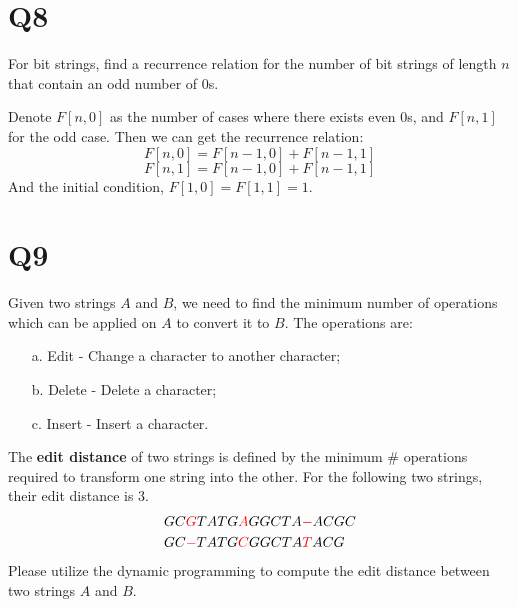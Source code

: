 \documentclass[a4paper,11pt]{article}
\begin{document}
\section*{Q8}
For bit strings, find a recurrence relation for the number of bit
strings of length $n$ that contain an odd number of 0s.
\begin{solution}
    Denote $F[n,0]$ as the number of cases where there exists even 0s, and
    $F[n,1]$ for the odd case. Then we can get the recurrence relation:
    \begin{equation*}
        F[n,0]=F[n-1,0]+F[n-1,1]
    \end{equation*}
    \begin{equation*}
        F[n,1]=F[n-1,0]+F[n-1,1]
    \end{equation*}
    And the initial condition, $F[1,0]=F[1,1]=1$.
\end{solution}

\section*{Q9}
Given two strings $A$ and $B$, we need to find the minimum number of operations which can be applied on $A$ to convert it to $B$. The operations are:
\begin{itemize}
    \item[a.] Edit - Change a character to another character;

    \item[b.] Delete - Delete a character;

    \item[c.] Insert - Insert a character.
\end{itemize}
The \textbf{edit distance} of two strings is defined by the minimum \# operations required to transform one string into the other. For the following two strings, their edit distance is 3.
\begin{align*}
    & GC\textcolor[rgb]{1.00,0.00,0.00}{G}TATG\textcolor[rgb]{1.00,0.00,0.00}{A}GGCTA\textcolor[rgb]{1.00,0.00,0.00}{-}ACGC\\
    & GC\textcolor[rgb]{1.00,0.00,0.00}{-}TATG\textcolor[rgb]{1.00,0.00,0.00}{C}GGCTA\textcolor[rgb]{1.00,0.00,0.00}{T}ACG
\end{align*}
Please utilize the dynamic programming to compute the edit distance between two strings $A$ and $B$.
\end{document}
